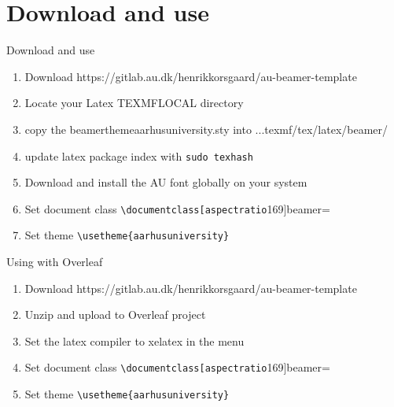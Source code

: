 \documentclass[aspectratio=169]{beamer}
\begin{document}
\section{Download and use}
\begin{frame}{Download and use}
\begin{enumerate}
    \item Download https://gitlab.au.dk/henrikkorsgaard/au-beamer-template
    \item Locate your Latex TEXMFLOCAL directory\footnotemark
    \item copy the beamerthemeaarhusuniversity.sty into ...texmf/tex/latex/beamer/
    \item update latex package index with \verb=sudo texhash=
    \item Download and install the AU font globally on your system
    \item Set document class \verb=\documentclass[aspectratio=169]{beamer}=
    \item Set theme \verb=\usetheme{aarhusuniversity}=
\end{enumerate}
\end{frame}

\begin{frame}{Using with Overleaf}
\begin{enumerate}
    \item Download https://gitlab.au.dk/henrikkorsgaard/au-beamer-template
    \item Unzip and upload to Overleaf project
    \item Set the latex compiler to xelatex in the menu
    \item Set document class \verb=\documentclass[aspectratio=169]{beamer}=
    \item Set theme \verb=\usetheme{aarhusuniversity}=
\end{enumerate}
\end{frame}
\end{document}
